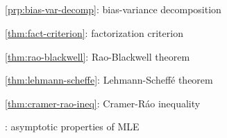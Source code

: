 \subsection*{}
\item \cref{prp:bias-var-decomp}: bias-variance decomposition
\item \cref{thm:fact-criterion}: factorization criterion
\item \cref{thm:rao-blackwell}: Rao-Blackwell theorem
\item \cref{thm:lehmann-scheffe}: Lehmann-Scheff\'{e} theorem
\item \cref{thm:cramer-rao-ineq}: Cramer-R\'{a}o inequality
\item {}: asymptotic properties of MLE
